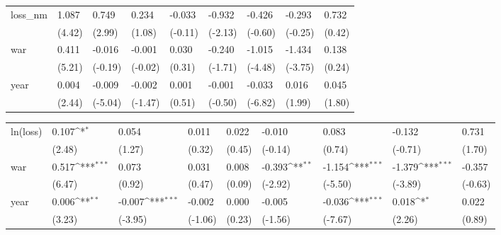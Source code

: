\begin{tabular}{p{1.5cm} p{2cm} p{1.7cm} p{1.7cm} p{1.7cm} p{1.7cm} p{1.7cm} p{1.7cm} p{1.7cm}}
\hline
loss\_nm         &    1.087\sym{***}&    0.749\sym{**} &    0.234         &   -0.033         &   -0.932\sym{*}  &   -0.426         &   -0.293         &    0.732         \\
                &   (4.42)         &   (2.99)         &   (1.08)         &  (-0.11)         &  (-2.13)         &  (-0.60)         &  (-0.25)         &   (0.42)         \\
war             &    0.411\sym{***}&   -0.016         &   -0.001         &    0.030         &   -0.240         &   -1.015\sym{***}&   -1.434\sym{***}&    0.138         \\
                &   (5.21)         &  (-0.19)         &  (-0.02)         &   (0.31)         &  (-1.71)         &  (-4.48)         &  (-3.75)         &   (0.24)         \\
year            &    0.004\sym{*}  &   -0.009\sym{***}&   -0.002         &    0.001         &   -0.001         &   -0.033\sym{***}&    0.016         &    0.045         \\
                &   (2.44)         &  (-5.04)         &  (-1.47)         &   (0.51)         &  (-0.50)         &  (-6.82)         &   (1.99)         &   (1.80)         \\
\end{tabular}
\def\sym#1{\ifmmode^{#1}\else\(^{#1}\)\fi}
\begin{tabular}{p{1.5cm} p{2cm} p{1.7cm} p{1.7cm} p{1.7cm} p{1.7cm} p{1.7cm} p{1.7cm} p{1.7cm}}
\hline
ln(loss)        &    0.107\sym{*}  &    0.054         &    0.011         &    0.022         &   -0.010         &    0.083         &   -0.132         &    0.731         \\
                &   (2.48)         &   (1.27)         &   (0.32)         &   (0.45)         &  (-0.14)         &   (0.74)         &  (-0.71)         &   (1.70)         \\
war             &    0.517\sym{***}&    0.073         &    0.031         &    0.008         &   -0.393\sym{**} &   -1.154\sym{***}&   -1.379\sym{***}&   -0.357         \\
                &   (6.47)         &   (0.92)         &   (0.47)         &   (0.09)         &  (-2.92)         &  (-5.50)         &  (-3.89)         &  (-0.63)         \\
year            &    0.006\sym{**} &   -0.007\sym{***}&   -0.002         &    0.000         &   -0.005         &   -0.036\sym{***}&    0.018\sym{*}  &    0.022         \\
                &   (3.23)         &  (-3.95)         &  (-1.06)         &   (0.23)         &  (-1.56)         &  (-7.67)         &   (2.26)         &   (0.89)         \\
\end{tabular}

